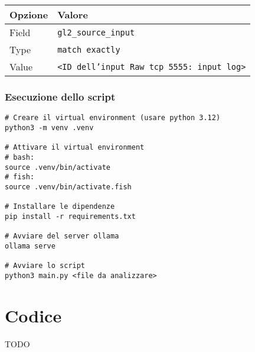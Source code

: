 \documentclass[12pt]{report}
\begin{document}
\begin{tabular}{|l|l|}
    \hline
    \textbf{Opzione} & \textbf{Valore}                                  \\ \hline
    Field            & \texttt{gl2\_source\_input}                      \\ \hline
    Type             & \texttt{match exactly}                           \\ \hline
    Value            & \texttt{<ID dell'input Raw tcp 5555: input log>} \\ \hline
\end{tabular}

\subsection*{Esecuzione dello script}
\label{subsec:esecuzione_script_v3}

\begin{verbatim}
# Creare il virtual environment (usare python 3.12)
python3 -m venv .venv

# Attivare il virtual environment
# bash:
source .venv/bin/activate
# fish:
source .venv/bin/activate.fish

# Installare le dipendenze
pip install -r requirements.txt

# Avviare del server ollama
ollama serve

# Avviare lo script
python3 main.py <file da analizzare>
\end{verbatim}



\clearpage


%
%

\appendix

\chapter{Codice}
\label{chap:appendice_codice}
TODO


%
%

\beforebibliography




\end{document}
